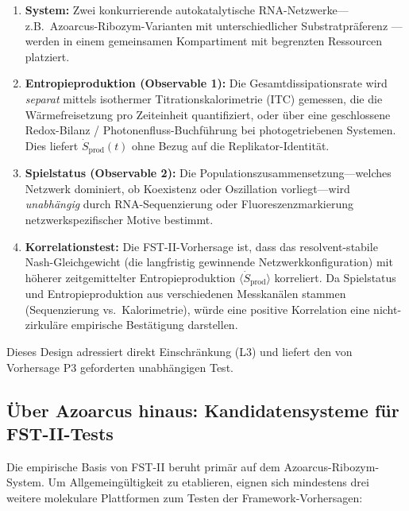 \documentclass[12pt,a4paper]{article}
\theoremstyle{remark}
\begin{document}
\begin{enumerate}
    \item \textbf{System:} Zwei konkurrierende autokatalytische RNA-Netzwerke---z.B.\ Azoarcus-Ribozym-Varianten mit unterschiedlicher Substratpr\"aferenz \citep{AzoarcusPMC}---werden in einem gemeinsamen Kompartiment mit begrenzten Ressourcen platziert.
    \item \textbf{Entropieproduktion (Observable 1):} Die Gesamtdissipationsrate wird \emph{separat} mittels isothermer Titrationskalorimetrie (ITC) gemessen, die die W\"armefreisetzung pro Zeiteinheit quantifiziert, oder \"uber eine geschlossene Redox-Bilanz / Photonenfluss-Buchf\"uhrung bei photogetriebenen Systemen. Dies liefert $\dot{S}_{\mathrm{prod}}(t)$ ohne Bezug auf die Replikator-Identit\"at.
    \item \textbf{Spielstatus (Observable 2):} Die Populationszusammensetzung---welches Netzwerk dominiert, ob Koexistenz oder Oszillation vorliegt---wird \emph{unabh\"angig} durch RNA-Sequenzierung oder Fluoreszenzmarkierung netzwerkspezifischer Motive bestimmt.
    \item \textbf{Korrelationstest:} Die FST-II-Vorhersage ist, dass das resolvent-stabile Nash-Gleichgewicht (die langfristig gewinnende Netzwerkkonfiguration) mit h\"oherer zeitgemittelter Entropieproduktion $\langle\dot{S}_{\mathrm{prod}}\rangle$ korreliert. Da Spielstatus und Entropieproduktion aus verschiedenen Messkan\"alen stammen (Sequenzierung vs.\ Kalorimetrie), w\"urde eine positive Korrelation eine nicht-zirkul\"are empirische Best\"atigung darstellen.
\end{enumerate}

\noindent
Dieses Design adressiert direkt Einschr\"ankung (L3) und liefert den von Vorhersage P3 geforderten unabh\"angigen Test.

\subsection{\"Uber Azoarcus hinaus: Kandidatensysteme f\"ur FST-II-Tests}
\label{sec:beyond-azoarcus}

Die empirische Basis von FST-II beruht prim\"ar auf dem Azoarcus-Ribozym-System. Um Allgemeing\"ultigkeit zu etablieren, eignen sich mindestens drei weitere molekulare Plattformen zum Testen der Framework-Vorhersagen:
\end{document}
